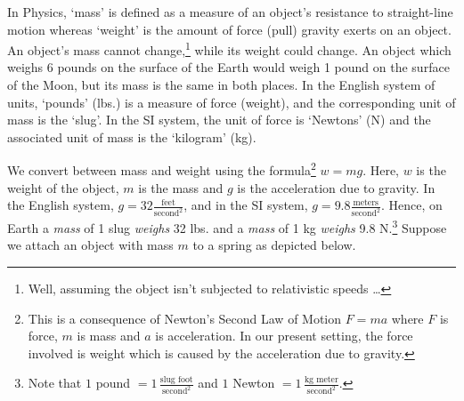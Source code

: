 \documentclass{ximera}
\begin{document}
 

In Physics, `mass' is defined as a measure of an object's resistance to straight-line motion whereas `weight' is the amount of force (pull) gravity exerts on an object.  An object's mass cannot change,\footnote{Well, assuming the object isn't subjected to relativistic speeds \dots} while its weight could change.  An object which weighs 6 pounds on the surface of the Earth would weigh 1 pound on the surface of the Moon, but its mass is the same in both places. In the English system of units, `pounds' (lbs.) is a measure of force (weight), and the corresponding unit of mass is the `slug'. In the SI system, the unit of force is `Newtons' (N) and the associated unit of mass is the `kilogram' (kg). 

 

We convert between mass and weight using the formula\footnote{This is a consequence of Newton's Second Law of Motion $F = ma$ where $F$ is force, $m$ is mass and $a$ is acceleration.  In our present setting, the force involved is weight which is caused by the acceleration due to gravity.} $w = mg$.   Here, $w$ is the weight of the object, $m$ is the mass and $g$ is the acceleration due to gravity.  In the English system, $g = 32 \frac{\text{feet}}{\text{second}^2}$, and in the SI system, $g = 9.8\frac{\text{meters}}{\text{second}^2}$. Hence, on Earth a \textit{mass} of 1 slug \textit{weighs} 32 lbs. and a \textit{mass} of 1 kg \textit{weighs} 9.8 N.\footnote{Note that $1$ pound $ = 1 \, \frac{\text{slug foot}}{\text{second}^2}$ and $1$ Newton $ = 1 \, \frac{\text{kg meter}}{\text{second}^2}$.}    Suppose we attach an object with mass $m$ to a spring as depicted below. 
\end{document}
